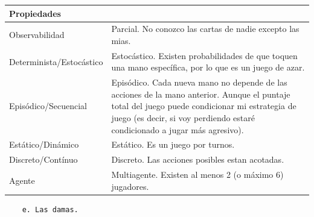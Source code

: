 \documentclass[11pt]{article}
\begin{document}
\begin{longtable}[]{@{}
  >{\raggedright\arraybackslash}p{}
  >{\raggedright\arraybackslash}p{}@{}}
\toprule\noalign{}
\begin{minipage}[b]{\linewidth}\raggedright
Propiedades
\end{minipage} & \begin{minipage}[b]{\linewidth}\raggedright
\end{minipage} \\
\midrule\noalign{}
\endhead
\bottomrule\noalign{}
\endlastfoot
Observabilidad & Parcial. No conozco las cartas de nadie excepto las
mias. \\
Determinista/Estocástico & Estocástico. Existen probabilidades de que
toquen una mano específica, por lo que es un juego de azar. \\
Episódico/Secuencial & Episódico. Cada nueva mano no depende de las
acciones de la mano anterior. Aunque el puntaje total del juego puede
condicionar mi estrategia de juego (es decir, si voy perdiendo estaré
condicionado a jugar más agresivo). \\
Estático/Dinámico & Estático. Es un juego por turnos. \\
Discreto/Contínuo & Discreto. Las acciones posibles estan acotadas. \\
Agente & Multiagente. Existen al menos 2 (o máximo 6) jugadores. \\
\end{longtable}

\begin{verbatim}
    e. Las damas.
\end{verbatim}
\end{document}
